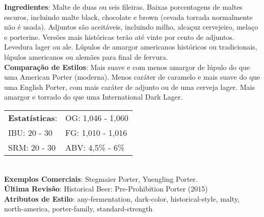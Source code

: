 \textbf{Ingredientes}: Malte de duas ou seis fileiras. Baixas porcentagens de maltes escuros, incluindo malte black, chocolate e brown (cevada torrada normalmente não é usada). Adjuntos são aceitáveis, incluindo milho, alcaçuz cervejeiro, melaço e porterine. Versões mais históricas terão até vinte por cento de adjuntos. Levedura lager ou ale. Lúpulos de amargor americanos históricos ou tradicionais, lúpulos americanos ou alemães para final de fervura. \\
\textbf{Comparação de Estilos}: Mais suave e com menos amargor de lúpulo do que uma American Porter (moderna). Menos caráter de caramelo e mais suave do que uma English Porter, com mais caráter de adjunto ou de uma cerveja lager. Mais amargor e torrado do que uma International Dark Lager. \\
\begin{tabular}{@{}p{35mm}p{35mm}@{}}
  \textbf{Estatísticas}: & OG: 1,046 - 1,060  \\
  IBU: 20 - 30  & FG: 1,010 - 1,016  \\
  SRM: 20 - 30 & ABV: 4,5\% - 6\%
\end{tabular}\\
\textbf{Exemplos Comerciais}: Stegmaier Porter, Yuengling Porter. \\
\textbf{Última Revisão}: Historical Beer: Pre-Prohibition Porter (2015) \\
\textbf{Atributos de Estilo}: any-fermentation, dark-color, historical-style, malty, north-america, porter-family, standard-strength
